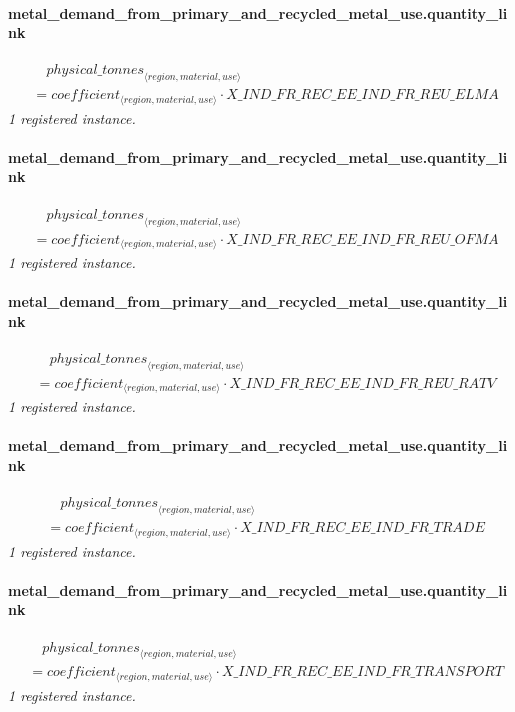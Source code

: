 \documentclass[11pt]{article}
\begin{document}
\paragraph{metal\_demand\_from\_primary\_and\_recycled\_metal\_use.quantity\_link}
\begin{align*}
&\quad {physical\_tonnes}_{\langle region, material, use\rangle}\\
&= coefficient_{\langle region, material, use\rangle} \cdot X\_IND\_FR\_REC\_EE\_IND\_FR\_REU\_ELMA
\end{align*}
\noindent\emph{1 registered instance.}\par
\paragraph{metal\_demand\_from\_primary\_and\_recycled\_metal\_use.quantity\_link}
\begin{align*}
&\quad {physical\_tonnes}_{\langle region, material, use\rangle}\\
&= coefficient_{\langle region, material, use\rangle} \cdot X\_IND\_FR\_REC\_EE\_IND\_FR\_REU\_OFMA
\end{align*}
\noindent\emph{1 registered instance.}\par
\paragraph{metal\_demand\_from\_primary\_and\_recycled\_metal\_use.quantity\_link}
\begin{align*}
&\quad {physical\_tonnes}_{\langle region, material, use\rangle}\\
&= coefficient_{\langle region, material, use\rangle} \cdot X\_IND\_FR\_REC\_EE\_IND\_FR\_REU\_RATV
\end{align*}
\noindent\emph{1 registered instance.}\par
\paragraph{metal\_demand\_from\_primary\_and\_recycled\_metal\_use.quantity\_link}
\begin{align*}
&\quad {physical\_tonnes}_{\langle region, material, use\rangle}\\
&= coefficient_{\langle region, material, use\rangle} \cdot X\_IND\_FR\_REC\_EE\_IND\_FR\_TRADE
\end{align*}
\noindent\emph{1 registered instance.}\par
\paragraph{metal\_demand\_from\_primary\_and\_recycled\_metal\_use.quantity\_link}
\begin{align*}
&\quad {physical\_tonnes}_{\langle region, material, use\rangle}\\
&= coefficient_{\langle region, material, use\rangle} \cdot X\_IND\_FR\_REC\_EE\_IND\_FR\_TRANSPORT
\end{align*}
\noindent\emph{1 registered instance.}\par
\end{document}
